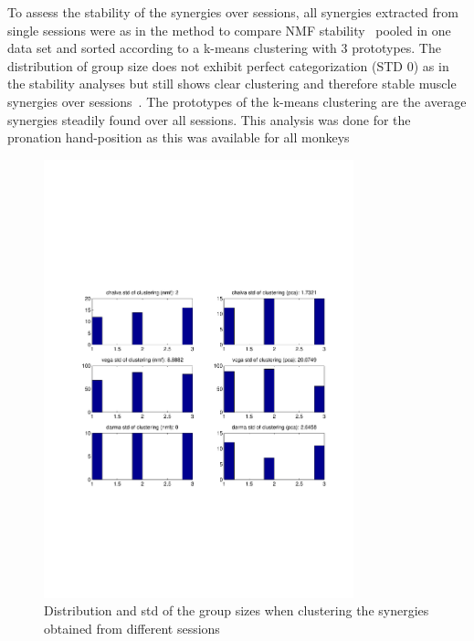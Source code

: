 To assess the stability of the synergies over sessions, all synergies extracted from single sessions were as in the method to compare NMF stability~ pooled in one data set and sorted according to a k-means clustering with 3 prototypes. The distribution of group size does not exhibit perfect categorization (STD 0) as in the stability analyses but still shows clear clustering and therefore stable muscle synergies over sessions~. The prototypes of the k-means clustering are the average synergies steadily found over all sessions. This analysis was done for the pronation hand-position as this was available for all monkeys


\begin{figure}[ht]
    \centering
    \includegraphics[width=0.8\textwidth]{images/syn_consist_sessions_std.pdf}
    \caption{Distribution and std of the group sizes when clustering the synergies obtained from different sessions}
    \label{sg:fig:images_syn_consist_sessions_std}
\end{figure}


